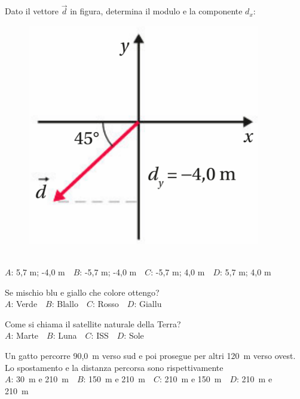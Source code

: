 \mcquestionheader Dato il vettore $\vec{d}$ in figura, determina il modulo e la componente $d_x$: \begin{figure}[h!]   \begin{center}     \includegraphics[scale=0.35]{vettored.png}   \end{center} \end{figure}\\
{$A$}: 5,7 m; -4,0 m\ \ {$B$}: -5,7 m; -4,0 m\ \ {$C$}: -5,7 m; 4,0 m\ \ {$D$}: 5,7 m; 4,0 m\ \ 

\mcquestionfooter



\def\mcquestionnumber{10}


\mcquestionheader Se mischio blu e giallo che colore ottengo?\\
{$A$}: Verde\ \ {$B$}: Blallo\ \ {$C$}: Rosso\ \ {$D$}: Giallu\ \ 

\mcquestionfooter



\def\mcquestionnumber{11}


\mcquestionheader Come si chiama il satellite naturale della Terra?\\
{$A$}: Marte\ \ {$B$}: Luna\ \ {$C$}: ISS\ \ {$D$}: Sole\ \ 

\mcquestionfooter



\def\mcquestionnumber{12}


\mcquestionheader Un gatto percorre 90,0~m verso sud e poi prosegue per altri 120~m verso ovest. Lo spostamento e la distanza percorsa sono rispettivamente\\
{$A$}: 30~m e 210~m\ \ {$B$}: 150~m e 210~m\ \ {$C$}: 210~m e 150~m\ \ {$D$}: 210~m e 210~m\ \ 

